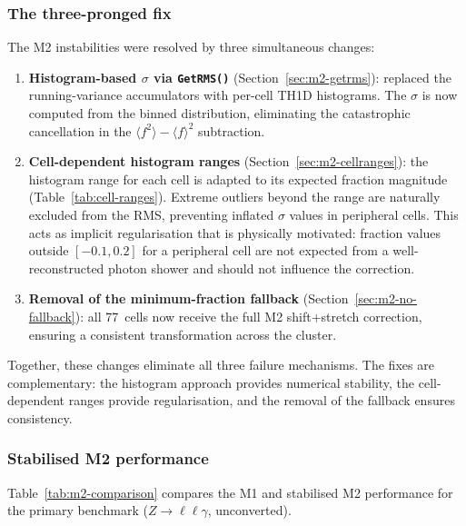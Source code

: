\documentclass[11pt,a4paper]{article}
\begin{document}
\subsubsection{The three-pronged fix}
\label{sec:disc-m2-fix}

The M2 instabilities were resolved by three simultaneous changes:

\begin{enumerate}
  \item \textbf{Histogram-based $\sigma$ via \texttt{GetRMS()}}
        (Section~\ref{sec:m2-getrms}): replaced the running-variance
        accumulators with per-cell TH1D histograms.  The $\sigma$ is
        now computed from the binned distribution, eliminating the
        catastrophic cancellation in the $\langle f^2 \rangle -
        \langle f \rangle^2$ subtraction.
  \item \textbf{Cell-dependent histogram ranges}
        (Section~\ref{sec:m2-cellranges}):  the histogram range
        for each cell is adapted to its expected fraction magnitude
        (Table~\ref{tab:cell-ranges}).  Extreme outliers beyond the
        range are naturally excluded from the RMS, preventing inflated
        $\sigma$ values in peripheral cells.  This acts as implicit
        regularisation that is physically motivated: fraction values
        outside $[-0.1, 0.2]$ for a peripheral cell are not expected
        from a well-reconstructed photon shower and should not
        influence the correction.
  \item \textbf{Removal of the minimum-fraction fallback}
        (Section~\ref{sec:m2-no-fallback}):  all 77~cells now receive
        the full M2 shift+stretch correction, ensuring a consistent
        transformation across the cluster.
\end{enumerate}

Together, these changes eliminate all three failure mechanisms.  The
fixes are complementary: the histogram approach provides numerical
stability, the cell-dependent ranges provide regularisation, and the
removal of the fallback ensures consistency.

\subsubsection{Stabilised M2 performance}
\label{sec:disc-m2-new}

Table~\ref{tab:m2-comparison} compares the M1 and stabilised M2
performance for the primary benchmark ($Z \to \ell\ell\gamma$,
unconverted).
\end{document}
